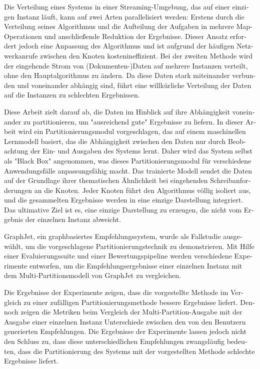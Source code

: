 \null\vfil
\begin{otherlanguage}{ngerman}
\begin{center}\textsf{\textbf{\abstractname}}\end{center}

\noindent 
Die Verteilung eines Systems in einer Streaming-Umgebung, das auf einer einzigen Instanz läuft, kann auf zwei Arten parallelisiert werden: Erstens durch die Verteilung seines Algorithmus und die Aufteilung der Aufgaben in mehrere Map-Operationen und anschließende Reduktion der Ergebnisse. Dieser Ansatz erfordert jedoch eine Anpassung des Algorithmus und ist aufgrund der häufigen Netzwerkanrufe zwischen den Knoten kostenineffizient. Bei der zweiten Methode wird der eingehende Strom von (Dokumenten-)Daten auf mehrere Instanzen verteilt, ohne den Hauptalgorithmus zu ändern. Da diese Daten stark miteinander verbunden und voneinander abhängig sind, führt eine willkürliche Verteilung der Daten auf die Instanzen zu schlechten Ergebnissen.

Diese Arbeit zielt darauf ab, die Daten im Hinblick auf ihre Abhängigkeit voneinander zu partitionieren, um "ausreichend gute" Ergebnisse zu liefern. In dieser Arbeit wird ein Partitionierungsmodul vorgeschlagen, das auf einem maschinellen Lernmodell basiert, das die Abhängigkeit zwischen den Daten nur durch Beobachtung der Ein- und Ausgaben des Systems lernt. Daher wird das System selbst als "Black Box" angenommen, was dieses Partitionierungsmodul für verschiedene Anwendungsfälle anpassungsfähig macht. Das trainierte Modell sendet die Daten auf der Grundlage ihrer thematischen Ähnlichkeit bei eingehenden Schreibanforderungen an die Knoten. Jeder Knoten führt den Algorithmus völlig isoliert aus, und die gesammelten Ergebnisse werden in eine einzige Darstellung integriert. Das ultimative Ziel ist es, eine einzige Darstellung zu erzeugen, die nicht vom Ergebnis der einzelnen Instanz abweicht.

GraphJet, ein graphbasiertes Empfehlungssystem, wurde als Fallstudie ausgewählt, um die vorgeschlagene Partitionierungstechnik zu demonstrieren. Mit Hilfe einer Evaluierungssuite und einer Bewertungspipeline werden verschiedene Experimente entworfen, um die Empfehlungsergebnisse einer einzelnen Instanz mit dem Multi-Partitionsmodell von GraphJet zu vergleichen.


Die Ergebnisse der Experimente zeigen, dass die vorgestellte Methode im Vergleich zu einer zufälligen Partitionierungsmethode bessere Ergebnisse liefert. Dennoch zeigen die Metriken beim Vergleich der Multi-Partition-Ausgabe mit der Ausgabe einer einzelnen Instanz Unterschiede zwischen den von den Benutzern generierten Empfehlungen. Die Ergebnisse der Experimente lassen jedoch nicht den Schluss zu, dass diese unterschiedlichen Empfehlungen zwangsläufig bedeuten, dass die Partitionierung des Systems mit der vorgestellten Methode schlechte Ergebnisse liefert.

\end{otherlanguage}
\vfil\null



